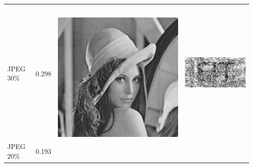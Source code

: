\begin{table}[h]
\begin{tabular}{llcc}
\begin{minipage}[c]{.15\textwidth}
 \end{minipage}  \\
JPEG 30\%                     & 0.298 &
\begin{minipage}[c]{.1\textwidth}
\ 
  \includegraphics[scale=0.1]{obrazky/jpeg30}
\end{minipage} &
 \begin{minipage}[c]{.15\textwidth}
   \includegraphics[scale=0.25]{obrazky/jpeg30-wm}
 \end{minipage}  \\
JPEG 20\%                    & 0.193 &
\begin{minipage}[c]{.1\textwidth}
\ 

\end{minipage}
\end{tabular}
\end{table}
